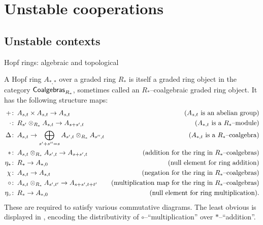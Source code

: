 
\chapter{Unstable cooperations}










\section{Unstable contexts}

Hopf rings: algebraic and topological

\begin{definition}
A Hopf ring $A_{*, *}$ over a graded ring $R_*$ is itself a graded ring object in the category $\mathsf{Coalgebras}_{R_*}$, sometimes called an $R_*$--coalgebraic graded ring object.  It has the following structure maps:
\begin{align*}
+ & \colon\thinspace A_{s, t} \times A_{s, t} \to A_{s, t} & \text{($A_{s, t}$ is an abelian group)} \\
\cdot & \colon\thinspace R_{s'} \otimes_{R_*} A_{s, t} \to A_{s+s', t} & \text{($A_{*, t}$ is a $R_*$--module)} \\
\Delta & \colon\thinspace A_{s, t} \to \bigoplus_{s' + s'' = s} A_{s', t} \otimes_{R_*} A_{s'', t} & \text{($A_{*, t}$ is a $R_*$--coalgebra)} \\
\ast & \colon\thinspace A_{s, t} \otimes_{R_*} A_{s', t} \to A_{s + s', t} & \text{(addition for the ring in $R_*$--coalgebras)} \\
\eta_\ast & \colon\thinspace R_* \to A_{*, 0} & \text{(null element for ring addition)} \\
\chi & \colon\thinspace A_{s, t} \to A_{s, t} & \text{(negation for the ring in $R_*$--coalgebras)} \\
\circ & \colon\thinspace A_{s, t} \otimes_{R_*} A_{s', t'} \to A_{s + s', t + t'} & \text{(multiplication map for the ring in $R_*$--coalgebras)} \\
\eta_\circ & \colon\thinspace R_* \to A_{*, 0} & \text{(null element for ring multiplication)}.
\end{align*}
These are required to satisfy various commutative diagrams. The least obvious is displayed in , encoding the distributivity of $\circ$--``multiplication'' over $\ast$--``addition''.
\end{definition}


